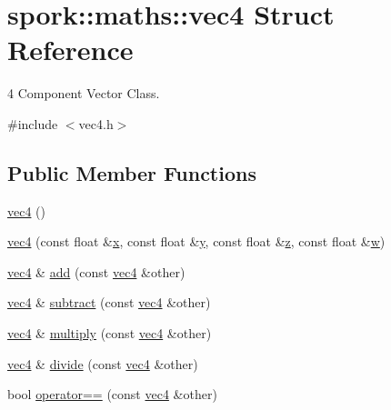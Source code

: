 \hypertarget{structspork_1_1maths_1_1vec4}{}\section{spork\+:\+:maths\+:\+:vec4 Struct Reference}
\label{structspork_1_1maths_1_1vec4}


4 Component Vector Class.  




{\ttfamily \#include $<$vec4.\+h$>$}

\subsection*{Public Member Functions}
\begin{DoxyCompactItemize}
\item 
\hyperlink{structspork_1_1maths_1_1vec4_a5c926bcafe3b59dc052f38c5fd4b37de}{vec4} ()
\item 
\hyperlink{structspork_1_1maths_1_1vec4_a22a9b30141b4b7b968823a0fb12e4e3e}{vec4} (const float \&\hyperlink{structspork_1_1maths_1_1vec4_a120e501d2f1b38dac84e612abf78c9ed}{x}, const float \&\hyperlink{structspork_1_1maths_1_1vec4_a7739a32314dfba099723036cc5b84a98}{y}, const float \&\hyperlink{structspork_1_1maths_1_1vec4_ab9786e1d7ec46d476a97d29330d568fe}{z}, const float \&\hyperlink{structspork_1_1maths_1_1vec4_ad8bf830957afe6cdf052c4f1d9d0ca45}{w})
\item 
\hyperlink{structspork_1_1maths_1_1vec4}{vec4} \& \hyperlink{structspork_1_1maths_1_1vec4_aa4eae30a8882321a03723525d734bcb1}{add} (const \hyperlink{structspork_1_1maths_1_1vec4}{vec4} \&other)
\item 
\hyperlink{structspork_1_1maths_1_1vec4}{vec4} \& \hyperlink{structspork_1_1maths_1_1vec4_ae5955d13e2aaf8617aa98fbdbd0e7a75}{subtract} (const \hyperlink{structspork_1_1maths_1_1vec4}{vec4} \&other)
\item 
\hyperlink{structspork_1_1maths_1_1vec4}{vec4} \& \hyperlink{structspork_1_1maths_1_1vec4_aa834cd0b688f659412b0f56918564092}{multiply} (const \hyperlink{structspork_1_1maths_1_1vec4}{vec4} \&other)
\item 
\hyperlink{structspork_1_1maths_1_1vec4}{vec4} \& \hyperlink{structspork_1_1maths_1_1vec4_abdfd9b22ded3a8c55f4381826afd143b}{divide} (const \hyperlink{structspork_1_1maths_1_1vec4}{vec4} \&other)
\item 
bool \hyperlink{structspork_1_1maths_1_1vec4_afbdaaf9efe13b03838fdac64c39220a6}{operator==} (const \hyperlink{structspork_1_1maths_1_1vec4}{vec4} \&other)

\end{DoxyCompactItemize}
